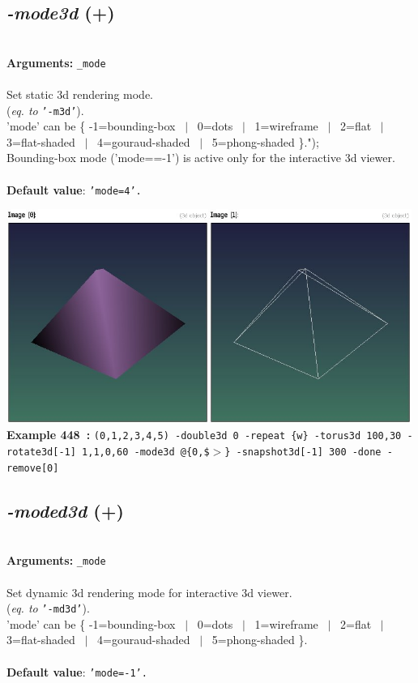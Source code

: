 \documentclass[a4paper,11pt,twoside]{book}
\begin{document}
\subsection{\emph{-mode3d} (+)}\vspace*{-0.5em}
~\\\textbf{Arguments: } 
{\small \texttt{\_mode}}\\~\\
Set static 3d rendering mode.
~\\(\emph{eq. to} {\small \texttt{'-m3d'}}).
~\\'mode' can be \{ -1=bounding-box ~$|$~ 0=dots ~$|$~ 1=wireframe ~$|$~ 2=flat ~$|$~ 3=flat-shaded ~$|$~ 4=gouraud-shaded ~$|$~ 5=phong-shaded \}.");
~\\Bounding-box mode ('mode==-1') is active only for the interactive 3d viewer.
~\\~\\\textbf{Default value}: {\small \texttt{'mode=4'.}}
\begin{center}\includegraphics[keepaspectratio=true,height=7cm,width=\textwidth]{img/gmic_def448.jpg}\\
{\footnotesize \textbf{Example 448~:} \texttt{(0,1,2,3,4,5) -double3d 0 -repeat \{w\} -torus3d 100,30 -rotate3d[-1] 1,1,0,60 -mode3d @\{0,\$$>$\} -snapshot3d[-1] 300 -done -remove[0]}}
\end{center}

\subsection{\emph{-moded3d} (+)}\vspace*{-0.5em}
~\\\textbf{Arguments: } 
{\small \texttt{\_mode}}\\~\\
Set dynamic 3d rendering mode for interactive 3d viewer.
~\\(\emph{eq. to} {\small \texttt{'-md3d'}}).
~\\'mode' can be \{ -1=bounding-box ~$|$~ 0=dots ~$|$~ 1=wireframe ~$|$~ 2=flat ~$|$~ 3=flat-shaded ~$|$~ 4=gouraud-shaded ~$|$~ 5=phong-shaded \}.
~\\~\\\textbf{Default value}: {\small \texttt{'mode=-1'.}}
\end{document}
